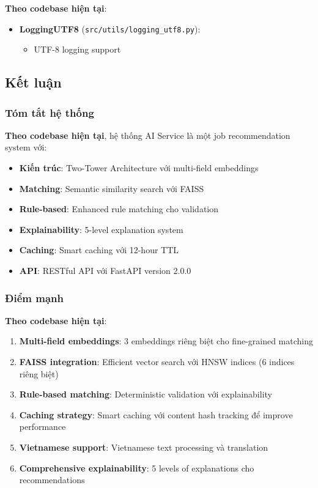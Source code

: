 \textbf{Theo codebase hiện tại}:

\begin{itemize}
    \item \textbf{LoggingUTF8} (\texttt{src/utils/logging\_utf8.py}):
    \begin{itemize}
        \item UTF-8 logging support
    \end{itemize}
\end{itemize}

\subsection{Kết luận}

\subsubsection{Tóm tắt hệ thống}

\textbf{Theo codebase hiện tại}, hệ thống AI Service là một job recommendation system với:

\begin{itemize}
    \item \textbf{Kiến trúc}: Two-Tower Architecture với multi-field embeddings
    \item \textbf{Matching}: Semantic similarity search với FAISS
    \item \textbf{Rule-based}: Enhanced rule matching cho validation
    \item \textbf{Explainability}: 5-level explanation system
    \item \textbf{Caching}: Smart caching với 12-hour TTL
    \item \textbf{API}: RESTful API với FastAPI version 2.0.0
\end{itemize}

\subsubsection{Điểm mạnh}

\textbf{Theo codebase hiện tại}:

\begin{enumerate}
    \item \textbf{Multi-field embeddings}: 3 embeddings riêng biệt cho fine-grained matching
    \item \textbf{FAISS integration}: Efficient vector search với HNSW indices (6 indices riêng biệt)
    \item \textbf{Rule-based matching}: Deterministic validation với explainability
    \item \textbf{Caching strategy}: Smart caching với content hash tracking để improve performance
    \item \textbf{Vietnamese support}: Vietnamese text processing và translation
    \item \textbf{Comprehensive explainability}: 5 levels of explanations cho recommendations
\end{enumerate}

